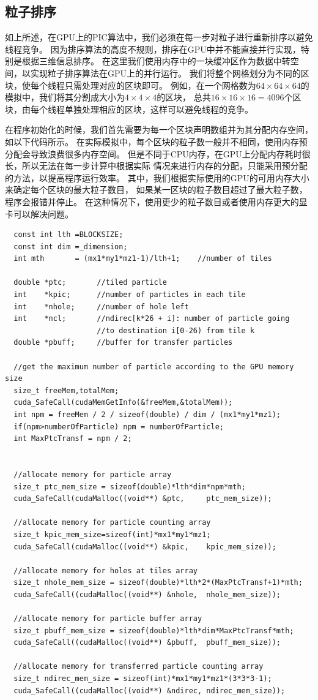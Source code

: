 \subsection{粒子排序}
\label{section:PIC_GPU_reorder}
如上所述，在GPU上的PIC算法中，我们必须在每一步对粒子进行重新排序以避免线程竞争。
因为排序算法的高度不规则，排序在GPU中并不能直接并行实现，特别是根据三维信息排序。
在这里我们使用内存中的一块缓冲区作为数据中转空间，以实现粒子排序算法在GPU上的并行运行。
我们将整个网格划分为不同的区块，使每个线程只需处理对应的区块即可。
例如，在一个网格数为$64 \times 64 \times 64$的模拟中，我们将其分割成大小为$4 \times 4 \times 4$的区块，
总共$16 \times 16 \times 16 = 4096$个区块，由每个线程单独处理相应的区块，这样可以避免线程的竞争。

在程序初始化的时候，我们首先需要为每一个区块声明数组并为其分配内存空间，如以下代码所示。
在实际模拟中，每个区块的粒子数一般并不相同，使用内存预分配会导致浪费很多内存空间。
但是不同于CPU内存，在GPU上分配内存耗时很长，所以无法在每一步计算中根据实际
情况来进行内存的分配，只能采用预分配的方法，以提高程序运行效率。
其中，我们根据实际使用的GPU的可用内存大小来确定每个区块的最大粒子数目，
如果某一区块的粒子数目超过了最大粒子数，程序会报错并停止。
在这种情况下，使用更少的粒子数目或者使用内存更大的显卡可以解决问题。

\begin{lstlisting}
  const int lth =BLOCKSIZE;
  const int dim =_dimension;
  int mth       = (mx1*my1*mz1-1)/lth+1;    //number of tiles

  double *ptc;       //tiled particle
  int    *kpic;      //number of particles in each tile
  int    *nhole;     //number of hole left
  int    *ncl;       //ndirec[k*26 + i]: number of particle going
                     //to destination i[0-26) from tile k
  double *pbuff;     //buffer for transfer particles

  //get the maximum number of particle according to the GPU memory size
  size_t freeMem,totalMem;
  cuda_SafeCall(cudaMemGetInfo(&freeMem,&totalMem));
  int npm = freeMem / 2 / sizeof(double) / dim / (mx1*my1*mz1);
  if(npm>numberOfParticle) npm = numberOfParticle;
  int MaxPtcTransf = npm / 2;


  //allocate memory for particle array
  size_t ptc_mem_size = sizeof(double)*lth*dim*npm*mth;
  cuda_SafeCall(cudaMalloc((void**) &ptc,     ptc_mem_size));

  //allocate memory for particle counting array
  size_t kpic_mem_size=sizeof(int)*mx1*my1*mz1;
  cuda_SafeCall(cudaMalloc((void**) &kpic,    kpic_mem_size));

  //allocate memory for holes at tiles array
  size_t nhole_mem_size = sizeof(double)*lth*2*(MaxPtcTransf+1)*mth;
  cuda_SafeCall((cudaMalloc((void**) &nhole,  nhole_mem_size));

  //allocate memory for particle buffer array
  size_t pbuff_mem_size = sizeof(double)*lth*dim*MaxPtcTransf*mth;
  cuda_SafeCall((cudaMalloc((void**) &pbuff,  pbuff_mem_size));

  //allocate memory for transferred particle counting array
  size_t ndirec_mem_size = sizeof(int)*mx1*my1*mz1*(3*3*3-1);
  cuda_SafeCall((cudaMalloc((void**) &ndirec, ndirec_mem_size));
\end{lstlisting}


